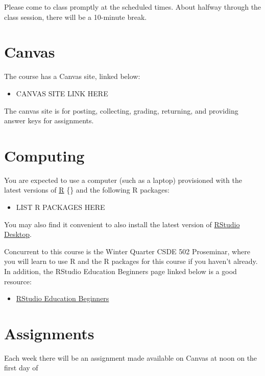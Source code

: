 \documentclass[
]{book}
\providecommand{\tightlist}{%
  \setlength{\itemsep}{0pt}\setlength{\parskip}{0pt}}
\begin{document}
Please come to class promptly at the scheduled times. About halfway through the class session, there will be a 10-minute break.

\hypertarget{canvas}{%
\section*{Canvas}\label{canvas}}

The course has a Canvas site, linked below:

\begin{itemize}
\tightlist
\item
  CANVAS SITE LINK HERE
\end{itemize}

The canvas site is for posting, collecting, grading, returning, and providing answer keys for assignments.

\hypertarget{computing}{%
\section*{Computing}\label{computing}}

You are expected to use a computer (such as a laptop) provisioned with the latest versions of \href{https://www.r-project.org/}{R} \{\citeyearpar{R-base}\} and the following R packages:

\begin{itemize}
\tightlist
\item
  LIST R PACKAGES HERE
\end{itemize}

You may also find it convenient to also install the latest version of \href{https://www.rstudio.com/products/rstudio/}{RStudio Desktop}.

Concurrent to this course is the Winter Quarter CSDE 502 Proseminar, where you will learn to use R and the R packages for this course if you haven't already. In addition, the RStudio Education Beginners page linked below is a good resource:

\begin{itemize}
\tightlist
\item
  \href{https://education.rstudio.com/learn/beginner/}{RStudio Education Beginners}
\end{itemize}

\hypertarget{assignments}{%
\section*{Assignments}\label{assignments}}

Each week there will be an assignment made available on Canvas at noon on the first day of

  
\end{document}
